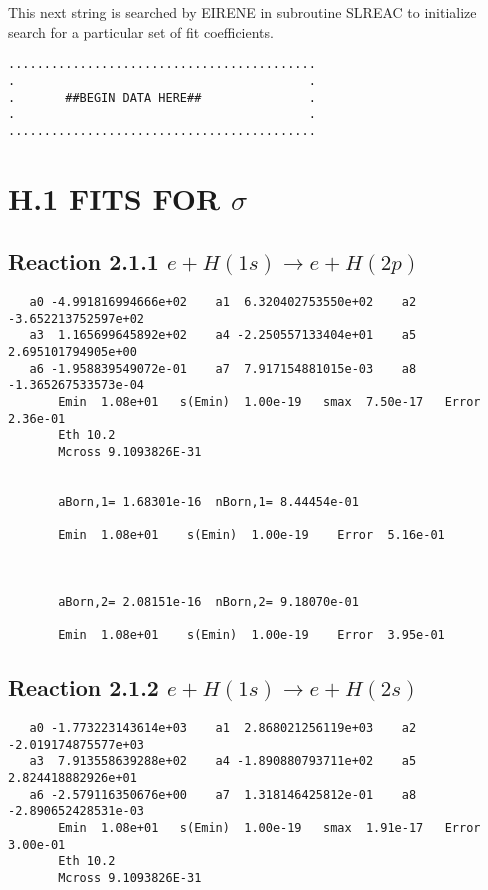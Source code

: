 \documentclass[12pt,dvipdfm]{article}
\begin{document}
This next string is searched by EIRENE in subroutine SLREAC
to initialize search for a particular set of fit coefficients.

\bigskip
\begin{small}\begin{verbatim}
...........................................
.                                         .
.       ##BEGIN DATA HERE##               .
.                                         .
...........................................
\end{verbatim}\end{small}
\newpage


\section{H.1  FITS FOR $\sigma$}

\subsection{
Reaction 2.1.1 $   e + H(1s) \rightarrow e + H(2p) $}


\begin{small}\begin{verbatim}
   a0 -4.991816994666e+02    a1  6.320402753550e+02    a2 -3.652213752597e+02
   a3  1.165699645892e+02    a4 -2.250557133404e+01    a5  2.695101794905e+00
   a6 -1.958839549072e-01    a7  7.917154881015e-03    a8 -1.365267533573e-04
       Emin  1.08e+01   s(Emin)  1.00e-19   smax  7.50e-17   Error  2.36e-01
       Eth 10.2
       Mcross 9.1093826E-31


       aBorn,1= 1.68301e-16  nBorn,1= 8.44454e-01

       Emin  1.08e+01    s(Emin)  1.00e-19    Error  5.16e-01



       aBorn,2= 2.08151e-16  nBorn,2= 9.18070e-01

       Emin  1.08e+01    s(Emin)  1.00e-19    Error  3.95e-01
\end{verbatim}\end{small}


\newpage
\subsection{
Reaction 2.1.2 $   e + H(1s) \rightarrow e + H(2s) $}

\begin{small}\begin{verbatim}
   a0 -1.773223143614e+03    a1  2.868021256119e+03    a2 -2.019174875577e+03
   a3  7.913558639288e+02    a4 -1.890880793711e+02    a5  2.824418882926e+01
   a6 -2.579116350676e+00    a7  1.318146425812e-01    a8 -2.890652428531e-03
       Emin  1.08e+01   s(Emin)  1.00e-19   smax  1.91e-17   Error  3.00e-01
       Eth 10.2
       Mcross 9.1093826E-31
\end{verbatim}\end{small}
\end{document}
